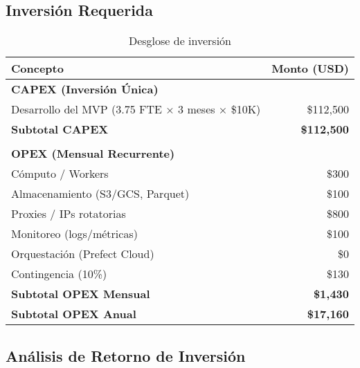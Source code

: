 \documentclass[12pt,a4paper]{article}
\begin{document}
\subsection{Inversión Requerida}

\begin{table}[h]
\centering
\begin{tabularx}{\textwidth}{|X|r|}
\hline
\rowcolor{lightgray}
\textbf{Concepto} & \textbf{Monto (USD)} \\
\hline
\multicolumn{2}{|l|}{\textbf{CAPEX (Inversión Única)}} \\
\hline
Desarrollo del MVP (3.75 FTE × 3 meses × \$10K) & \$112,500 \\
\hline
\rowcolor{lightgray}
\textbf{Subtotal CAPEX} & \textbf{\$112,500} \\
\hline
\multicolumn{2}{|c|}{} \\
\hline
\multicolumn{2}{|l|}{\textbf{OPEX (Mensual Recurrente)}} \\
\hline
Cómputo / Workers & \$300 \\
\hline
Almacenamiento (S3/GCS, Parquet) & \$100 \\
\hline
Proxies / IPs rotatorias & \$800 \\
\hline
Monitoreo (logs/métricas) & \$100 \\
\hline
Orquestación (Prefect Cloud) & \$0 \\
\hline
Contingencia (10\%) & \$130 \\
\hline
\rowcolor{lightgray}
\textbf{Subtotal OPEX Mensual} & \textbf{\$1,430} \\
\hline
\rowcolor{lightgray}
\textbf{Subtotal OPEX Anual} & \textbf{\$17,160} \\
\hline
\end{tabularx}
\caption{Desglose de inversión}
\end{table}

\subsection{Análisis de Retorno de Inversión}
\end{document}
